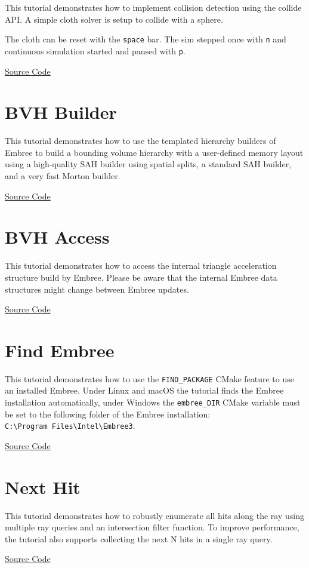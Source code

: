 This tutorial demonstrates how to implement collision detection using
the collide API. A simple cloth solver is setup to collide with a
sphere.

The cloth can be reset with the \texttt{space} bar. The sim stepped once
with \texttt{n} and continuous simulation started and paused with
\texttt{p}.

\href{https://github.com/embree/embree/blob/master/tutorials/collide/collide_device.cpp}{Source
Code}

\section{BVH Builder}\label{bvh-builder}

This tutorial demonstrates how to use the templated hierarchy builders
of Embree to build a bounding volume hierarchy with a user-defined
memory layout using a high-quality SAH builder using spatial splits, a
standard SAH builder, and a very fast Morton builder.

\href{https://github.com/embree/embree/blob/master/tutorials/bvh_builder/bvh_builder_device.cpp}{Source
Code}

\section{BVH Access}\label{bvh-access}

This tutorial demonstrates how to access the internal triangle
acceleration structure build by Embree. Please be aware that the
internal Embree data structures might change between Embree updates.

\href{https://github.com/embree/embree/blob/master/tutorials/bvh_access/bvh_access.cpp}{Source
Code}

\section{Find Embree}\label{find-embree}

This tutorial demonstrates how to use the \texttt{FIND\_PACKAGE} CMake
feature to use an installed Embree. Under Linux and macOS the tutorial
finds the Embree installation automatically, under Windows the
\texttt{embree\_DIR} CMake variable must be set to the following folder
of the Embree installation:
\texttt{C:\textbackslash{}Program\ Files\textbackslash{}Intel\textbackslash{}Embree3}.

\href{https://github.com/embree/embree/blob/master/tutorials/find_embree/CMakeLists.txt}{Source
Code}

\section{Next Hit}\label{next-hit}

This tutorial demonstrates how to robustly enumerate all hits along the
ray using multiple ray queries and an intersection filter function. To
improve performance, the tutorial also supports collecting the next N
hits in a single ray query.

\href{https://github.com/embree/embree/blob/master/tutorials/next_hit/next_hit_device.cpp}{Source
Code}
